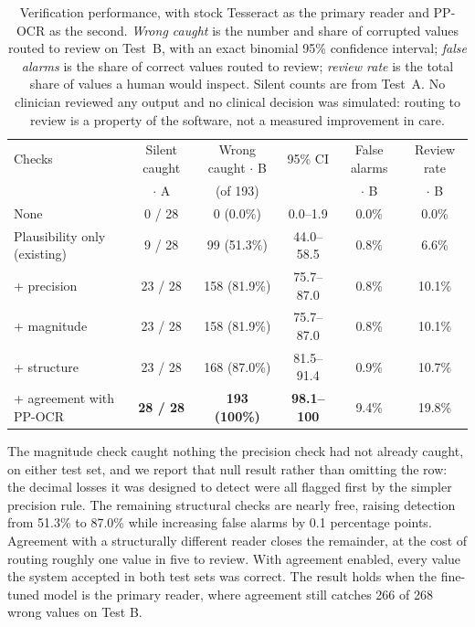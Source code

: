 \documentclass[11pt]{article}
\begin{document}
\begin{table}[t]
\centering
\caption{Verification performance, with stock Tesseract as the primary reader and PP-OCR as the
second. \emph{Wrong caught} is the number and share of corrupted values routed to review on
Test~B, with an exact binomial 95\% confidence interval; \emph{false alarms} is the share of
correct values routed to review; \emph{review rate} is the total share of values a human would
inspect. Silent counts are from Test~A. No clinician reviewed any output and no clinical
decision was simulated: routing to review is a property of the software, not a measured
improvement in care.}
\label{tab:verify}
\small
\begin{tabular}{lccccc}
\toprule
Checks & Silent caught & Wrong caught $\cdot$ B & 95\% CI & False alarms & Review rate \\
       & $\cdot$ A & (of 193) & & $\cdot$ B & $\cdot$ B \\
\midrule
None                              & \phantom{0}0 / 28 & \phantom{00}0 \phantom{0}(0.0\%) & \phantom{0}0.0--1.9 & 0.0\% & \phantom{0}0.0\% \\
Plausibility only (existing)      & \phantom{0}9 / 28 & \phantom{0}99 (51.3\%) & 44.0--58.5 & 0.8\% & \phantom{0}6.6\% \\
\quad + precision                 & 23 / 28 & 158 (81.9\%) & 75.7--87.0 & 0.8\% & 10.1\% \\
\quad + magnitude                 & 23 / 28 & 158 (81.9\%) & 75.7--87.0 & 0.8\% & 10.1\% \\
\quad + structure                 & 23 / 28 & 168 (87.0\%) & 81.5--91.4 & 0.9\% & 10.7\% \\
\quad + agreement with PP-OCR     & \textbf{28 / 28} & \textbf{193 (100\%)} & \textbf{98.1--100} & 9.4\% & 19.8\% \\
\bottomrule
\end{tabular}
\end{table}

The magnitude check caught nothing the precision check had not already caught, on either test
set, and we report that null result rather than omitting the row: the decimal losses it was
designed to detect were all flagged first by the simpler precision rule. The remaining
structural checks are nearly free, raising detection from 51.3\% to 87.0\% while increasing
false alarms by 0.1 percentage points. Agreement with a structurally different reader
closes the remainder, at the cost of routing roughly one value in five to review. With agreement
enabled, every value the system accepted in both test sets was correct. The result holds when
the fine-tuned model is the primary reader, where agreement still catches 266 of 268 wrong
values on Test B.
\end{document}
